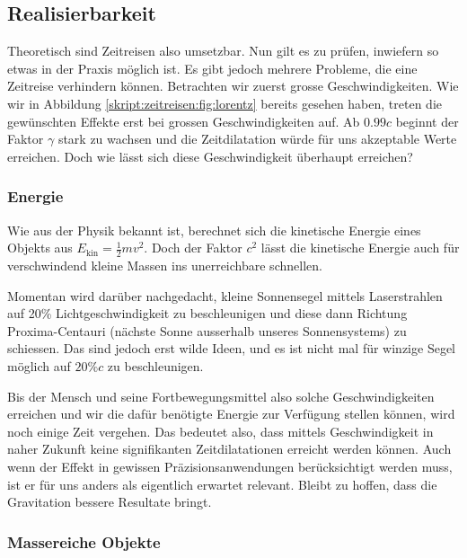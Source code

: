 \begin{refsection}
	\section{Realisierbarkeit}
    
    Theoretisch sind Zeitreisen also umsetzbar. Nun gilt es zu prüfen, inwiefern so etwas in der Praxis möglich ist. Es gibt jedoch mehrere Probleme, die eine Zeitreise verhindern können.
    Betrachten wir zuerst grosse Geschwindigkeiten. Wie wir in Abbildung \ref{skript:zeitreisen:fig:lorentz} bereits gesehen haben, treten die gewünschten Effekte erst bei grossen Geschwindigkeiten auf. Ab $0.99c$ beginnt der Faktor $\gamma$ stark zu wachsen und die Zeitdilatation würde für uns akzeptable Werte erreichen.
    Doch wie lässt sich diese Geschwindigkeit überhaupt erreichen?
    
    \subsubsection{Energie}\label{skript:chapters:zrirtreisen:energie}
    
    Wie aus der Physik bekannt ist, berechnet sich die kinetische Energie eines Objekts aus $E_{\text{kin}}=\frac{1}{2}mv^2$. Doch der Faktor $c^2$ lässt die kinetische Energie auch für verschwindend kleine Massen ins unerreichbare schnellen.
    
    Momentan wird darüber nachgedacht, kleine Sonnensegel mittels Laserstrahlen auf 20\% Lichtgeschwindigkeit zu beschleunigen und diese dann Richtung Proxima-Centauri (nächste Sonne ausserhalb unseres Sonnensystems) zu schiessen. Das sind jedoch erst wilde Ideen, und es ist nicht mal für winzige Segel möglich auf $20\%c$ zu beschleunigen. 
    
    Bis der Mensch und seine Fortbewegungsmittel also solche Geschwindigkeiten erreichen und wir die dafür benötigte Energie zur Verfügung stellen können, wird noch einige Zeit vergehen.
    Das bedeutet also, dass mittels Geschwindigkeit in naher Zukunft keine signifikanten Zeitdilatationen erreicht werden können. Auch wenn der Effekt in gewissen Präzisionsanwendungen berücksichtigt werden muss, ist er für uns anders als eigentlich erwartet relevant. Bleibt zu hoffen, dass die Gravitation bessere Resultate bringt. 
    
    \subsubsection{Massereiche Objekte}
    

\end{refsection}
